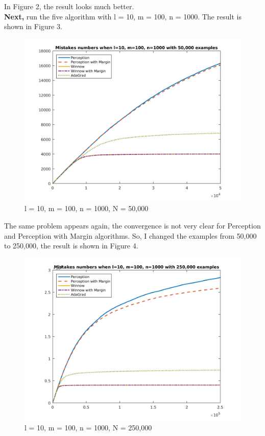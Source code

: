 \begin{enumerate}
In Figure 2, the result looks much better.\\

{\bf Next,} run the five algorithm with l = 10, m = 100, n = 1000. The result is shown in Figure 3.\\

\begin{figure}[H] 
\begin{center}
\includegraphics[width=7in]{Ex1mistake3.png}
\caption{l = 10, m = 100, n = 1000, N = 50,000}
\end{center}
\end{figure}

The same problem appears again, the convergence is not very clear for Perception and Perception with Margin algorithms. So, I changed the examples from 50,000 to 250,000, the result is shown in Figure 4.\\

\begin{figure}[H] 
\begin{center}
\includegraphics[width=7in]{Ex1mistake4.png}
\caption{l = 10, m = 100, n = 1000, N = 250,000}
\end{center}
\end{figure}


\end{enumerate}
